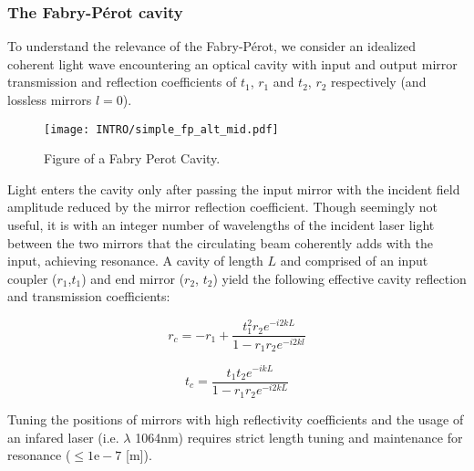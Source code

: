 \subsubsection{The Fabry-P\'{e}rot cavity}
\label{section:FPC}
To understand the relevance of the Fabry-P\'{e}rot, we consider an idealized coherent light wave encountering an optical cavity with input and output mirror transmission and reflection coefficients of $t_1$, $r_1$ and $t_2$, $r_2$ respectively (and lossless mirrors $l=0$).

\begin{figure}[ht!]
	\centering
	\texttt{[image: INTRO/simple\_fp\_alt\_mid.pdf]}
	\caption{Figure of a Fabry Perot Cavity. }
	\label{fig:fp_cav}
\end{figure}

Light enters the cavity only after passing the input mirror with the incident field amplitude reduced by the mirror reflection coefficient. Though seemingly not useful, it is with an integer number of wavelengths of the incident laser light between the two mirrors that the circulating beam coherently adds with the input, achieving resonance.  A cavity of length $L$ and comprised of an input coupler ($r_1$,$t_1$) and end mirror ($r_2$, $t_2$) yield the following effective cavity reflection and transmission coefficients: 

\iffalse that the input and circulating that the photons belonging to a particular phasefront can be experimentally tracked, and lucky for us this is is why we measure interference at the anti-symmetric port. But these benefit with a constant source at the cavity input the phasefronts entering the cavity are superimposed onto the circulating cavity field and, more often than not, add incoherently which can makes this thought experiment seem silly.\fi 

\begin{equation}
	r_c = -r_1 + \frac{t^2_1r_2 e^{-i2kL}}{1-r_1 r_2 e^{-i2kl}}
\end{equation}

\begin{equation}
	t_c = \frac{t_1 t_2 e^{-ikL}}{1-r_1 r_2 e^{-i2kL}}	
\end{equation}

Tuning the positions of mirrors with high reflectivity coefficients and the usage of an infared laser (i.e. $\lambda$ 1064nm) requires strict length tuning and maintenance for resonance ($\leq 1\mathrm{e-}7$ [m]). 

